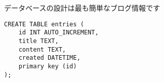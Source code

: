 データベースの設計は最も簡単なブログ情報です

\begin{lstlisting}[numbers=none]
CREATE TABLE entries (
    id INT AUTO_INCREMENT,
    title TEXT,
    content TEXT,
    created DATETIME,
    primary key (id)
);
\end{lstlisting}

